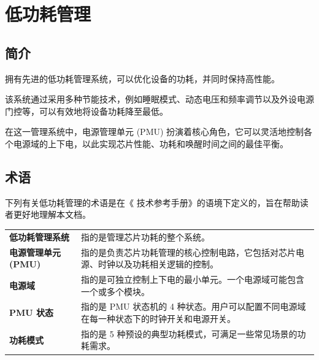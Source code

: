 \documentclass[main\_\_CN.tex]{subfiles}
\begin{document}

\ifglobal
\else
    {\let\clearpage\relax \listoftodos}
    {\let\clearpage\relax \listofdonetodos}
    \tableofcontents
\fi





\hypertarget{lowpowm}{}
\chapter{低功耗管理}\label{mod:lowpowm}

\section{简介}

\chipname{} 拥有先进的低功耗管理系统，可以优化设备的功耗，并同时保持高性能。

该系统通过采用多种节能技术，例如睡眠模式、动态电压和频率调节以及外设电源门控等，可以有效地将设备功耗降至最低。

在这一管理系统中，电源管理单元 (PMU) 扮演着核心角色，它可以灵活地控制各个电源域的上下电，以此实现芯片性能、功耗和唤醒时间之间的最佳平衡。

\section{术语}

下列有关低功耗管理的术语是在《\chipname{} 技术参考手册》的语境下定义的，旨在帮助读者更好地理解本文档。

\begin{longtable}[c]{ R{4cm} p{12cm} }
\textbf{低功耗管理系统} & 指的是管理芯片功耗的整个系统。\\
\textbf{电源管理单元 (PMU)} & 指的是负责芯片功耗管理的核心控制电路，它包括对芯片电源、时钟以及功耗相关逻辑的控制。\\
\textbf{电源域} & 指的是可独立控制上下电的最小单元。一个电源域可能包含一个或多个模块。 \\
\textbf{PMU 状态} & 指的是 PMU 状态机的 4 种状态。用户可以配置不同电源域在每一种状态下的时钟开关和电源开关。\\
\textbf{功耗模式} & 指的是 5 种预设的典型功耗模式，可满足一些常见场景的功耗需求。\\
\end{longtable}
\end{document}
